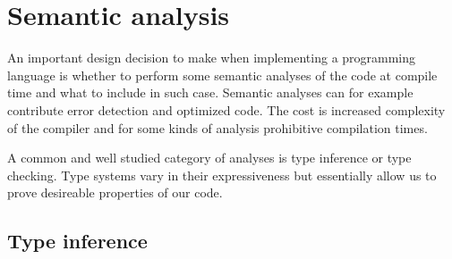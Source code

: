 \section{Semantic analysis}

An important design decision to make when implementing a programming language is whether to perform some semantic analyses of the code at compile time and what to include in such case. Semantic analyses can for example contribute error detection and optimized code. The cost is increased complexity of the compiler and for some kinds of analysis prohibitive compilation times.

A common and well studied category of analyses is type inference or type checking. Type systems vary in their expressiveness but essentially allow us to prove desireable properties of our code.



\subsection{Type inference}









